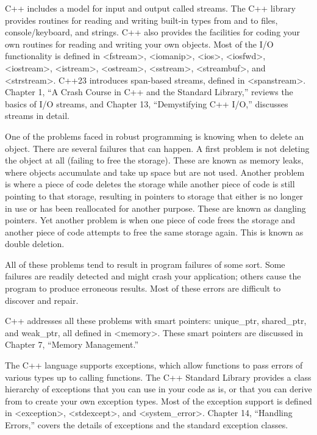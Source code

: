 
C++ includes a model for input and output called streams. The C++ library provides routines for reading and writing built-in types from and to files, console/keyboard, and strings. C++ also provides the facilities for coding your own routines for reading and writing your own objects. Most of the I/O functionality is defined in <fstream>, <iomanip>, <ios>, <iosfwd>, <iostream>, <istream>, <ostream>, <sstream>, <streambuf>, and <strstream>. C++23 introduces span-based streams, defined in <spanstream>. Chapter 1, “A Crash Course in C++ and the Standard Library,” reviews the basics of I/O streams, and Chapter 13, “Demystifying C++ I/O,” discusses streams in detail.


One of the problems faced in robust programming is knowing when to delete an object. There are several failures that can happen. A first problem is not deleting the object at all (failing to free the storage). These are known as memory leaks, where objects accumulate and take up space but are not used. Another problem is where a piece of code deletes the storage while another piece of code is still pointing to that storage, resulting in pointers to storage that either is no longer in use or has been reallocated for another purpose. These are known as dangling pointers. Yet another problem is when one piece of code frees the storage and another piece of code attempts to free the same storage again.
This is known as double deletion.

All of these problems tend to result in program failures of some sort. Some failures are readily detected and might crash your application; others cause the program to produce erroneous results.
Most of these errors are difficult to discover and repair.

C++ addresses all these problems with smart pointers: unique\_ptr, shared\_ptr, and weak\_ptr, all defined in <memory>. These smart pointers are discussed in Chapter 7, “Memory Management.”


The C++ language supports exceptions, which allow functions to pass errors of various types up to calling functions. The C++ Standard Library provides a class hierarchy of exceptions that you can use in your code as is, or that you can derive from to create your own exception types. Most of the exception support is defined in <exception>, <stdexcept>, and <system\_error>. Chapter 14, “Handling Errors,” covers the details of exceptions and the standard exception classes.

